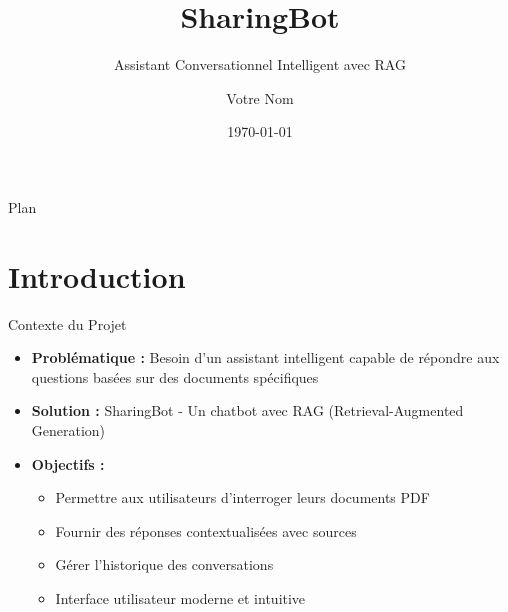 \documentclass[aspectratio=169]{beamer}
\title{SharingBot}
\subtitle{Assistant Conversationnel Intelligent avec RAG}
\author{Votre Nom}
\institute{Votre Institution}
\date{\today}
\begin{document}
\begin{frame}
    \titlepage
\end{frame}

\begin{frame}{Plan}
    \tableofcontents
\end{frame}

\section{Introduction}

\begin{frame}{Contexte du Projet}
    \begin{itemize}
        \item \textbf{Problématique :} Besoin d'un assistant intelligent capable de répondre aux questions basées sur des documents spécifiques
        \item \textbf{Solution :} SharingBot - Un chatbot avec RAG (Retrieval-Augmented Generation)
        \item \textbf{Objectifs :}
        \begin{itemize}
            \item Permettre aux utilisateurs d'interroger leurs documents PDF
            \item Fournir des réponses contextualisées avec sources
            \item Gérer l'historique des conversations
            \item Interface utilisateur moderne et intuitive
        \end{itemize}
    \end{itemize}
\end{frame}
\end{document}
